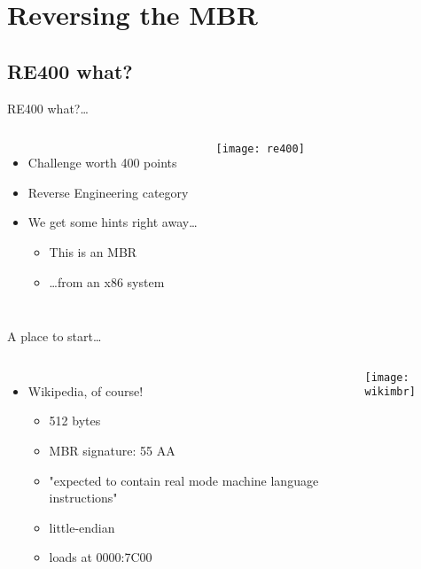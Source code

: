 
\section{Reversing the MBR}

\subsection{RE400 what?}

\begin{frame}{RE400 what?\ldots}
    \begin{columns}
	        \begin{itemize}
                \item Challenge worth 400 points
                \item Reverse Engineering category
                \item We get some hints right away\ldots
                \begin{itemize}
                	\item This is an MBR
                	\item \ldots from an x86 system
        	    \end{itemize}
            \end{itemize}
                {\texttt{[image: re400]}}
    \end{columns}
\end{frame}

\begin{frame}{A place to start\ldots}
    \begin{columns}
	        \begin{itemize}
                \item<1-> Wikipedia, of course!
		        \begin{itemize}
    	            \item<2-> 512 bytes
        	        \item<2-> MBR signature: 55 AA
            	    \item<2-> "expected to contain real mode machine language instructions"
                	\item<2-> little-endian
                	\item<2-> loads at 0000:7C00
	            \end{itemize}                	
            \end{itemize}
                {\texttt{[image: wikimbr]}}
    \end{columns}
\end{frame}

